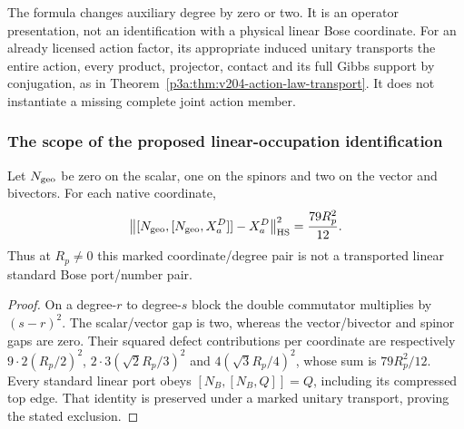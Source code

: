 \documentclass[11pt,a4paper]{article}
\begin{document}
The formula changes auxiliary degree by zero or two. It is an operator
presentation, not an identification with a physical linear Bose coordinate.
For an already licensed action factor, its appropriate induced unitary
transports the entire action, every product, projector, contact and its full
Gibbs support by conjugation, as in
Theorem~\ref{p3a:thm:v204-action-law-transport}. It does not instantiate a
missing complete joint action member.

\subsubsection{The scope of the proposed linear-occupation identification}
\begin{proposition}
\label{p2b:prop:v2174-geometric-linear-port-defect}
Let $N_{\rm geo}$ be zero on the scalar, one on the spinors and two on
the vector and bivectors. For each native coordinate,
\[
 \bigl\|[N_{\rm geo},[N_{\rm geo},X_a^D]]-X_a^D\bigr\|_{\rm HS}^2
       =\frac{79R_p^2}{12}.
\]
Thus at $R_p\ne0$ this marked coordinate/degree pair is not a transported
linear standard Bose port/number pair.
\end{proposition}
\begin{proof}
On a degree-$r$ to degree-$s$ block the double commutator multiplies by
$(s-r)^2$. The scalar/vector gap is two, whereas the vector/bivector and
spinor gaps are zero. Their squared defect contributions per coordinate
are respectively
$9\cdot2(R_p/2)^2$, $2\cdot3(\sqrt2R_p/3)^2$ and
$4(\sqrt3R_p/4)^2$, whose sum is $79R_p^2/12$.
Every standard linear port obeys $[N_B,[N_B,Q]]=Q$, including its
compressed top edge. That identity is preserved under a marked unitary
transport, proving the stated exclusion.
\end{proof}
\end{document}
